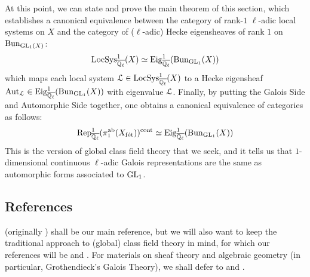             At this point, we can state and prove the main theorem of this section, which establishes a canonical equivalence between the category of rank-$1$ $\ell$-adic local systems on $X$ and the category of ($\ell$-adic) Hecke eigensheaves of rank $1$ on $\mathrm{Bun}_{\operatorname{GL}_1(X)}$:
                $$\mathrm{LocSys}_{\overline{\mathbb{Q}_{\ell}}}^1(X) \simeq \mathrm{Eig}^1_{\overline{\mathbb{Q}_{\ell}}}(\mathrm{Bun}_{\operatorname{GL}_1}(X))$$
            which maps each local system $\mathcal{L} \in \mathrm{LocSys}_{\overline{\mathbb{Q}_{\ell}}}^1(X)$ to a Hecke eigensheaf $\mathrm{Aut}_{\mathcal{L}} \in \mathrm{Eig}^1_{\overline{\mathbb{Q}_{\ell}}}(\mathrm{Bun}_{\operatorname{GL}_1}(X))$ with eigenvalue $\mathcal{L}$. Finally, by putting the Galois Side and Automorphic Side together, one obtains a canonical equivalence of categories as follows:
                $$\mathrm{Rep}_{\overline{\mathbb{Q}_{\ell}}}^1(\pi_1^{\mathrm{ab}}(X_{\mathrm{f\acute{e}t}}))^{\mathrm{cont}} \simeq \mathrm{Eig}^1_{\overline{\mathbb{Q}_{\ell}}}(\mathrm{Bun}_{\operatorname{GL}_1}(X))$$
            This is the version of global class field theory that we seek, and it tells us that $1$-dimensional continuous $\ell$-adic Galois representations are the same as automorphic forms associated to $\operatorname{GL}_1$.
	    
        \subsection{References}
    	    \cite{tendler_2015_geometric_class_field_theory} (originally \cite{tendler_2010_geometric_class_field_theory_original}) shall be our main reference, but we will also want to keep the traditional approach to (global) class field theory in mind, for which our references will be \cite[Chapter VI]{neukirch_2010_algebraic_number_theory} and \cite[Chapter VIII]{neukirch_1999_cohomology_of_number_field}. For materials on sheaf theory and algebraic geometry (in particular, Grothendieck's Galois Theory), we shall defer to \cite{stacks} and \cite[Expos\'e V]{SGA1}. 
    	    
	\printbibliography

